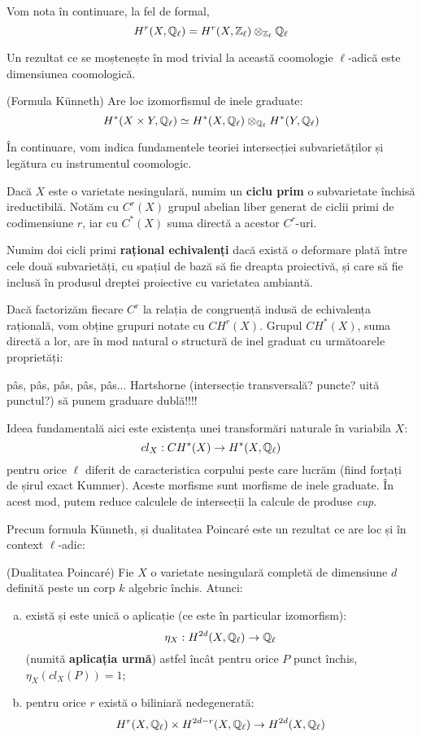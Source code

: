 \documentclass[13pt,openany]{book}
\begin{document}
Vom nota în continuare, la fel de formal,
$$H^r(X,\mathbb{Q}_\ell) = H^r(X,\mathbb{Z}_\ell) \otimes_{\mathbb{Z}_\ell} \mathbb{Q}_\ell$$

Un rezultat ce se moștenește în mod trivial la această coomologie $\ell$-adică este dimensiunea coomologică.

\begin{teo}
(Formula Künneth) Are loc izomorfismul de inele graduate:
$$H^*(X\times Y,\mathbb{Q}_\ell) \simeq H^*(X,\mathbb{Q}_\ell) \otimes_{\mathbb{Q}_\ell} H^*(Y,\mathbb{Q}_\ell)$$
\end{teo}

În continuare, vom indica fundamentele teoriei intersecției subvarietăților și legătura cu instrumentul coomologic.

Dacă $X$ este o varietate nesingulară, numim un {\bf ciclu prim} o subvarietate închisă ireductibilă. Notăm cu $C^r(X)$ grupul abelian liber generat de ciclii primi de codimensiune $r$, iar cu $C^*(X)$ suma directă a acestor $C^r$-uri.

Numim doi cicli primi {\bf rațional echivalenți} dacă există o deformare plată între cele două subvarietăți, cu spațiul de bază să fie dreapta proiectivă, și care să fie inclusă în produsul dreptei proiective cu varietatea ambiantă.

Dacă factorizăm fiecare $C^r$ la relația de congruență indusă de echivalența rațională, vom obține grupuri notate cu $CH^r(X)$. Grupul $CH^*(X)$, suma directă a lor, are în mod natural o structură de inel graduat cu următoarele proprietăți:

pâs, pâs, pâs, pâs, pâs... Hartshorne (intersecție transversală? puncte? uită punctul?) să punem graduare dublă!!!!

Ideea fundamentală aici este existența unei transformări naturale în variabila $X$:
$$cl_X : CH^*(X) \rightarrow H^*(X,\mathbb{Q}_\ell)$$
pentru orice $\ell$ diferit de caracteristica corpului peste care lucrăm (fiind forțați de șirul exact Kummer). Aceste morfisme sunt morfisme de inele graduate. În acest mod, putem reduce calculele de intersecții la calcule de produse {\it cup}.

Precum formula Künneth, și dualitatea Poincaré este un rezultat ce are loc și în context $\ell$-adic:

\begin{teo}
(Dualitatea Poincaré) Fie $X$ o varietate nesingulară completă de dimensiune $d$ definită peste un corp $k$ algebric închis. Atunci:
\begin{enumerate}[a)]
\item există și este unică o aplicație (ce este în particular izomorfism):
$$\eta_X : H^{2d}(X,\mathbb{Q}_\ell) \rightarrow \mathbb{Q}_\ell$$
(numită {\bf aplicația urmă}) astfel încât pentru orice $P$ punct închis, $\eta_X(cl_X(P))=1$;
\item pentru orice $r$ există o biliniară nedegenerată:
$$H^r(X,\mathbb{Q}_\ell) \times H^{2d-r}(X,\mathbb{Q}_\ell) \rightarrow H^{2d}(X,\mathbb{Q}_\ell)$$
\end{enumerate}
\end{teo}
\end{document}
